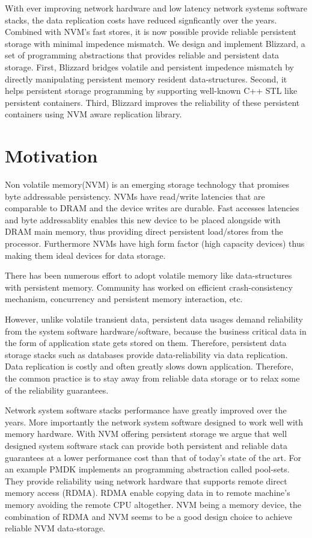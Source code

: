 With ever improving network hardware and low latency network systems software stacks, 
the data replication costs have reduced signficantly over the years. Combined with NVM's
fast stores, it is now possible provide reliable persistent storage with minimal impedence
mismatch. We design and implement Blizzard, a set of programming abstractions that provides 
reliable and persistent data storage. First, Blizzard bridges volatile and persistent impedence
mismatch by directly manipulating persistent memory resident data-structures. Second, it helps
persistent storage programming by supporting well-known C++ STL like persistent containers.
Third, Blizzard improves the reliability of these persistent containers using NVM aware replication library.


\section{Motivation}
Non volatile memory(NVM) is an emerging storage technology that promises byte addressable 
persistency. NVMs have read/write latencies that are comparable to DRAM and the device 
writes are durable. Fast accesses latencies and byte addressablity enables this new device
to be placed alongside with DRAM main memory, thus providing direct persistent load/stores
from the processor. Furthermore NVMs have high form factor (high capacity devices) thus
making them ideal devices for data storage. 

There has been numerous effort to adopt volatile memory like data-structures with persistent
memory. Community has worked on efficient crash-consistency mechanism, concurrency and persistent
memory interaction, etc. 

However, unlike volatile transient data, persistent data usages
demand reliability from the system software hardware/software, because the business critical data
in the form of application state gets stored on them. Therefore, persistent data storage stacks such
as databases provide data-reliability via data replication. Data replication is costly and often
greatly slows down application. Therefore, the common practice is to stay away from reliable data
storage or to relax some of the reliability guarantees.

Network system software stacks performance have greatly improved over the years. More importantly
the network system software designed to work well with memory hardware. With NVM offering persistent
storage we argue that well designed system software stack can provide both persistent and reliable
data guarantees at a lower performance cost than that of today's state of the art. For an example
PMDK implements an programming abstraction called pool-sets. They provide reliability using network
hardware that supports remote direct memory access (RDMA). RDMA enable copying data in to remote
machine's memory avoiding the remote CPU altogether. NVM being a memory device, the combination of
RDMA and NVM seems to be a good design choice to achieve reliable NVM data-storage.

